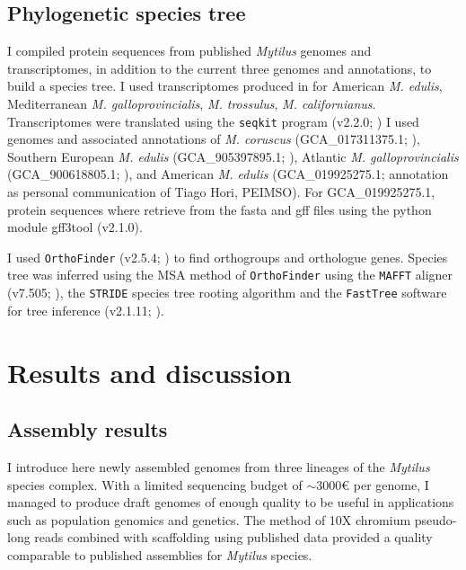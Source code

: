 \documentclass[11pt, a4paper]{article}
\begin{document}
\subsection{Phylogenetic species tree}

I compiled protein sequences from published \textit{Mytilus} genomes and transcriptomes,
in addition to the current three genomes and annotations, to build a species tree.
I used transcriptomes produced in \textcite{Popovic2020a} for American \textit{M. edulis}, 
Mediterranean \textit{M. galloprovincialis}, \textit{M. trossulus}, \textit{M. californianus}.
Transcriptomes were translated using the \texttt{seqkit} program (v2.2.0; \cite{Shen2016})
I used genomes and associated annotations of \textit{M. coruscus} (GCA\_017311375.1; \cite{Yang2021}),
Southern European \textit{M. edulis} (GCA\_905397895.1; \cite{Corrochano-Fraile2022}),
Atlantic \textit{M. galloprovincialis} (GCA\_900618805.1; \cite{Gerdol2020}),
and American \textit{M. edulis} (GCA\_019925275.1; annotation as personal communication of Tiago Hori, PEIMSO).
For GCA\_019925275.1, protein sequences where retrieve from the fasta and gff files using the python module gff3tool (v2.1.0).

I used \texttt{OrthoFinder} (v2.5.4; \cite{Emms2015, Emms2019}) to find orthogroups and orthologue genes.
Species tree was inferred using the MSA method of \texttt{OrthoFinder} \parencite{Emms2018} using the \texttt{MAFFT} aligner (v7.505; \cite{Katoh2013}), the \texttt{STRIDE} species tree rooting algorithm \parencite{Emms2017} and the \texttt{FastTree} software for tree inference (v2.1.11; \cite{Price2009}).


\section{Results and discussion}


\subsection{Assembly results}

I introduce here newly assembled genomes from three lineages of the \textit{Mytilus} species complex.
With a limited sequencing budget of $\sim3000$€ per genome, I managed to produce draft genomes of enough quality to be useful
in applications such as population genomics and genetics.
The method of 10X chromium pseudo-long reads combined with scaffolding using published data provided a quality comparable to published assemblies for \textit{Mytilus} species.
\end{document}
